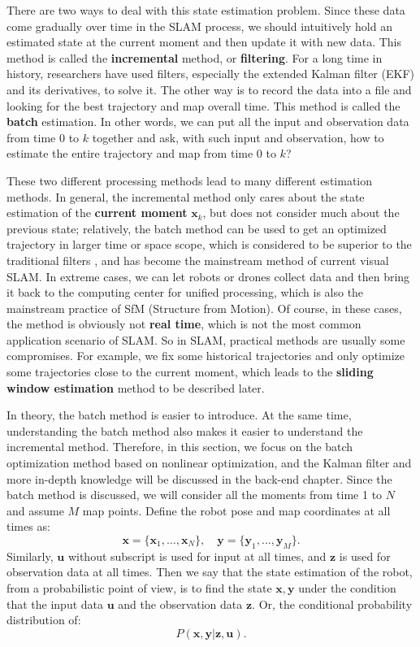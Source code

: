 There are two ways to deal with this state estimation problem. Since these data come gradually over time in the SLAM process, we should intuitively hold an estimated state at the current moment and then update it with new data. This method is called the \textbf {incremental} method, or \textbf{filtering}. For a long time in history, researchers have used filters, especially the extended Kalman filter (EKF) and its derivatives, to solve it. The other way is to record the data into a file and looking for the best trajectory and map overall time. This method is called the \textbf {batch} estimation. In other words, we can put all the input and observation data from time 0 to $ k $ together and ask, with such input and observation, how to estimate the entire trajectory and map from time 0 to $ k $?

These two different processing methods lead to many different estimation methods. In general, the incremental method only cares about the state estimation of the \textbf {current moment} $ \bm {x} _k $, but does not consider much about the previous state; relatively, the batch method can be used to get an optimized trajectory in larger time or space scope, which is considered to be superior to the traditional filters \textsuperscript {\cite {Strasdat2012}}, and has become the mainstream method of current visual SLAM. In extreme cases, we can let robots or drones collect data and then bring it back to the computing center for unified processing, which is also the mainstream practice of SfM (Structure from Motion). Of course, in these cases, the method is obviously not \textbf {real time}, which is not the most common application scenario of SLAM. So in SLAM, practical methods are usually some compromises. For example, we fix some historical trajectories and only optimize some trajectories close to the current moment, which leads to the \textbf {sliding window estimation} method to be described later.

In theory, the batch method is easier to introduce. At the same time, understanding the batch method also makes it easier to understand the incremental method. Therefore, in this section, we focus on the batch optimization method based on nonlinear optimization, and the Kalman filter and more in-depth knowledge will be discussed in the back-end chapter. Since the batch method is discussed, we will consider all the moments from time 1 to $N$ and assume $M$ map points. Define the robot pose and map coordinates at all times as:
\[
\bm{x}=\{ \bm{x}_1, \ldots, \bm{x}_N \}, \quad \bm{y} = \{\bm{y}_1, \ldots, \bm{y}_M \}.
\]
Similarly, $ \bm {u} $ without subscript is used for input at all times, and $ \bm {z} $ is used for observation data at all times. Then we say that the state estimation of the robot, from a probabilistic point of view, is to find the state $ \bm {x} , \bm{y}$ under the condition that the input data $ \bm {u} $ and the observation data $\bm{z} $. Or, the conditional probability distribution of:
\begin{equation}
P( \bm{x},\bm{y} | \bm{z}, \bm{u}).
\end{equation}

